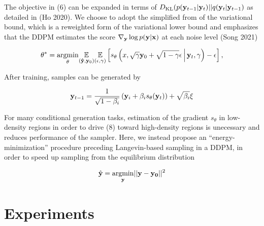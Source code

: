 \documentclass{article}
\begin{document}
The objective in (6) can be expanded in terms of $D_{\mathrm{KL}}(p(\bold{y}_{t-1}|\bold{y}_{t})|| q(\bold{y}_{t}|\bold{y}_{t-1})$ as detailed in (Ho 2020). We choose to adopt the simplified from of the variational bound, which is a reweighted form of the variational lower bound and emphasizes that the DDPM estimates the score $\nabla_{\bold{y}}\log p(\bold{y}|\bold{x})$ at each noise level (Song 2021)

\begin{equation}
\theta^{*} = \underset{\theta}{\mathrm{argmin}} \underset{(\bold{\hat{y}},\bold{y}_{0})}{\mathbb{E}}\underset{(\epsilon,\gamma)}{\mathbb{E}} \left[ s_{\theta}\left(x, \sqrt{\gamma} \bold{y}_0 + \sqrt{1 - \gamma} \epsilon \, \middle|\, \bold{y}_{t}, \gamma\right) - \epsilon \right],
\end{equation}

After training, samples can be generated by 

\begin{equation}
\bold{y}_{t-1} = \frac{1}{\sqrt{1-\beta_{i}}}\left(\bold{y}_{i} + \beta_{i}s_{\theta}(\bold{y}_{t})\right) + \sqrt{\beta_{i}}\bold{\xi}
\end{equation}

For many conditional generation tasks, estimation of the gradient $s_{\theta}$ in low-density regions in order to drive (8) toward high-density regions is unecessary and reduces performance of the sampler. Here, we instead propose an ``energy-minimization'' procedure preceding Langevin-based sampling in a DDPM, in order to speed up sampling from the equilibrium distribution

\begin{equation}
\hat{\bold{y}} = \underset{\bold{y}}{\mathrm{argmin}} ||\bold{y}-\bold{y_0}||^2
\end{equation} 



\section{Experiments}
\end{document}
